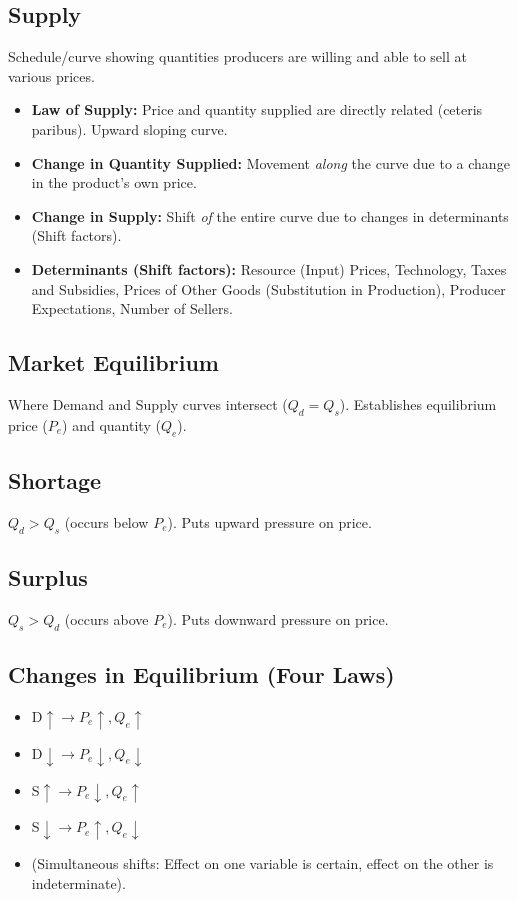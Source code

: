 \documentclass{article}
\begin{document}
\subsection*{Supply}
Schedule/curve showing quantities producers are willing and able to sell at various prices.
\begin{itemize}
    \item \textbf{Law of Supply:} Price and quantity supplied are directly related (ceteris paribus). Upward sloping curve.
    \item \textbf{Change in Quantity Supplied:} Movement \textit{along} the curve due to a change in the product's own price.
    \item \textbf{Change in Supply:} Shift \textit{of} the entire curve due to changes in determinants (Shift factors).
    \item \textbf{Determinants (Shift factors):} Resource (Input) Prices, Technology, Taxes and Subsidies, Prices of Other Goods (Substitution in Production), Producer Expectations, Number of Sellers.
\end{itemize}

\subsection*{Market Equilibrium}
Where Demand and Supply curves intersect ($Q_d = Q_s$). Establishes equilibrium price ($P_e$) and quantity ($Q_e$).

\subsection*{Shortage}
$Q_d > Q_s$ (occurs below $P_e$). Puts upward pressure on price.

\subsection*{Surplus}
$Q_s > Q_d$ (occurs above $P_e$). Puts downward pressure on price.

\subsection*{Changes in Equilibrium (Four Laws)}
\begin{itemize}
    \item D$\uparrow \rightarrow P_e\uparrow, Q_e\uparrow$
    \item D$\downarrow \rightarrow P_e\downarrow, Q_e\downarrow$
    \item S$\uparrow \rightarrow P_e\downarrow, Q_e\uparrow$
    \item S$\downarrow \rightarrow P_e\uparrow, Q_e\downarrow$
    \item (Simultaneous shifts: Effect on one variable is certain, effect on the other is indeterminate).
\end{itemize}
\end{document}
